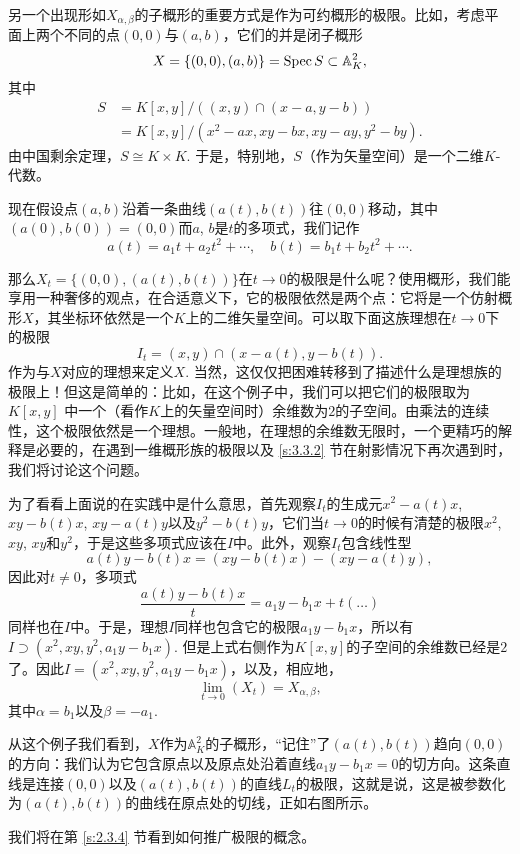 另一个出现形如$X_{\alpha,\beta}$的子概形的重要方式是作为可约概形的极限。比如，考虑平面上两个不同的点$(0,0)$与$(a,b)$，它们的并是闭子概形
\[
	X=\{(0,0),(a,b)\}=\operatorname{Spec} S\subset \mathbb{A}_K^2,
\]
其中
\[
\begin{aligned}
	S&=K[x,y]/\left((x,y)\cap (x-a,y-b)\right)\\
	&=K[x,y]/(x^2-ax,xy-bx,xy-ay,y^2-by).
\end{aligned}
\]
由中国剩余定理，$S\cong K\times K$. 于是，特别地，$S$（作为矢量空间）是一个二维$K$\hyp 代数。

现在假设点$(a,b)$沿着一条曲线$(a(t),b(t))$往$(0,0)$移动，其中$(a(0),b(0))=(0,0)$而$a$, $b$是$t$的多项式，我们记作
\[
	a(t)=a_1t+a_2t^2+\cdots,\quad b(t)=b_1t+b_2t^2+\cdots.
\]


那么$X_t=\{(0,0),(a(t),b(t))\}$在$t\to 0$的极限是什么呢？使用概形，我们能享用一种奢侈的观点，在合适意义下，它的极限依然是两个点：它将是一个仿射概形$X$，其坐标环依然是一个$K$上的二维矢量空间。可以取下面这族理想在$t\to 0$下的极限
\[
	I_t=(x,y)\cap (x-a(t),y-b(t)).
\]
作为与$X$对应的理想来定义$X$. 当然，这仅仅把困难转移到了描述什么是理想族的极限上！但这是简单的：比如，在这个例子中，我们可以把它们的极限取为$K[x,y]$
中一个（看作$K$上的矢量空间时）余维数为$2$的子空间。由乘法的连续性，这个极限依然是一个理想。一般地，在理想的余维数无限时，一个更精巧的解释是必要的，在遇到一维概形族的极限以及 \ref{s:3.3.2} 节在射影情况下再次遇到时，我们将讨论这个问题。

为了看看上面说的在实践中是什么意思，首先观察$I_t$的生成元$x^2-a(t)x$, $xy-b(t)x$, $xy-a(t)y$以及$y^2-b(t)y$，它们当$t\to 0$的时候有清楚的极限$x^2$, $xy$, $xy$和$y^2$，于是这些多项式应该在$I$中。此外，观察$I_t$包含线性型
\[
	a(t)y-b(t)x=(xy-b(t)x)-(xy-a(t)y),
\]
因此对$t\neq 0$，多项式
\[
	\frac{a(t)y-b(t)x}{t}=a_1y-b_1x+t(\dots)
\]
同样也在$I$中。于是，理想$I$同样也包含它的极限$a_1y-b_1x$，所以有$I\supset (x^2,xy,y^2,a_1y-b_1x)$. 但是上式右侧作为$K[x,y]$的子空间的余维数已经是$2$了。因此$I=(x^2,xy,y^2,a_1y-b_1x)$，以及，相应地，
\[
	\lim_{t\to 0}(X_t)=X_{\alpha,\beta},
\]
其中$\alpha=b_1$以及$\beta=-a_1$.

\wrapb
\indent 从这个例子我们看到，$X$作为$\mathbb{A}_K^2$的子概形，“记住”了$(a(t),b(t))$趋向$(0,0)$的方向：我们认为它包含原点以及原点处沿着直线$a_1y-b_1x=0$的切方向。这条直线是连接$(0,0)$以及$(a(t),b(t))$的直线$L_t$的极限，这就是说，这是被参数化为$(a(t),b(t))$的曲线在原点处的切线，正如右图所示。

我们将在第 \ref{s:2.3.4} 节看到如何推广极限的概念。

